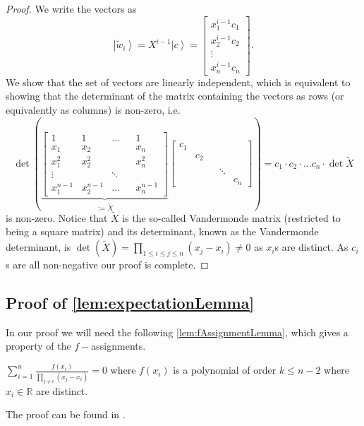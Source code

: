 \documentclass{article}
\begin{document}
\begin{proof}
	We write the vectors as 
	\begin{displaymath}
	\left|\tilde{w}_{i}\right\rangle =X^{i-1}\left|c\right\rangle =\left[\begin{array}{c}
	x_{1}^{i-1}c_{1}\\
	x_{2}^{i-1}c_{2}\\
	\vdots\\
	x_{n}^{i-1}c_{n}
	\end{array}\right].
	\end{displaymath}
	We show that the set of vectors are linearly independent, which is
	equivalent to showing that the determinant of the matrix containing
	the vectors as rows (or equivalently as columns) is non-zero, i.e.
	\begin{displaymath}
	\det\left(\underbrace{\left[\begin{array}{ccccc}
		1 & 1 & \dots &  & 1\\
		x_{1} & x_{2} &  &  & x_{n}\\
		x_{1}^{2} & x_{2}^{2} &  &  & x_{n}^{2}\\
		\vdots &  & \ddots\\
		x_{1}^{n-1} & x_{2}^{n-1} & \dots &  & x_{n}^{n-1}
		\end{array}\right]}_{:=\tilde{X}}\left[\begin{array}{ccccc}
	c_{1}\\
	& c_{2}\\
	\\
	&  &  & \ddots\\
	&  &  &  & c_{n}
	\end{array}\right]\right)=c_{1}\cdot c_{2}\cdot\dots c_{n}\cdot\det\tilde{X}
	\end{displaymath}
	is non-zero. Notice that $\tilde{X}$ is the so-called
	Vandermonde matrix (restricted to being a square matrix) and its determinant,
	known as the Vandermonde determinant, is $\det(\tilde{X})=\prod_{1\le i\le j\le n}(x_{j}-x_{i})\neq0$
	as $x_{i}$s are distinct. As $c_{i}$s are all non-negative our
	proof is complete.
\end{proof}
\subsection{Proof of \ref{lem:expectationLemma}}\label{subsec:proofexpectationlemma}
In our proof we will need the following \ref{lem:fAssignmentLemma}, which gives a property of the $f-$assignments. 
\begin{lemma}
	\label{lem:fAssignmentLemma} $\sum_{i=1}^{n}\frac{f(x_{i})}{\prod_{j\neq i}(x_{j}-x_{i})}=0$
	where $f(x_{i})$ is a polynomial of order $k\le n-2$ where $x_{i}\in\mathbb{R}$
	are distinct.
\end{lemma}
The proof can be found in \cite{Mochon07,ACG+14}. 
\end{document}
